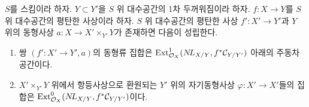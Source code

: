 \begin{lemma}
\label{lemma-deform-spaces}
$S$를 스킴이라 하자. $Y \subset Y'$을 $S$ 위 대수공간의 1차
두꺼워짐이라 하자. $f : X \to Y$를 $S$ 위 대수공간의 평탄한 사상이라
하자. $S$ 위 대수공간의 평탄한 사상 $f' : X' \to Y'$과 $Y$ 위의
동형사상 $a : X \to X' \times_{Y'} Y$가 존재하면 다음이 성립한다.
\begin{enumerate}
\item 쌍 $(f' : X' \to Y', a)$의 동형류 집합은
$\mathop{\mathrm{Ext}}\nolimits^1_{\mathcal{O}_X}(\mathop{N\!L}\nolimits_{X/Y}, f^*\mathcal{C}_{Y/Y'})$ 아래의 주동차
공간이다.
\item $X' \times_{Y'} Y$ 위에서 항등사상으로 환원되는 $Y'$ 위의
자기동형사상 $\varphi : X' \to X'$들의 집합은
$\mathop{\mathrm{Ext}}\nolimits^0_{\mathcal{O}_X}(\mathop{N\!L}\nolimits_{X/Y}, f^*\mathcal{C}_{Y/Y'})$이다.
\end{enumerate}
\end{lemma}

